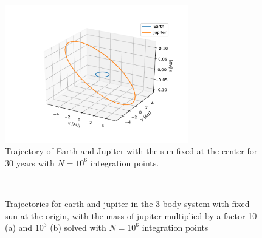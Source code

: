 \documentclass[10pt,showpacs,preprintnumbers,amsmath,amssymb,nofootinbib,aps,prl,twocolumn,groupedaddress,superscriptaddress,showkeys]{revtex4-1}
\begin{document}
  \begin{figure}[h!]
    \center
    \includegraphics[width=8cm]{figs/exe_earth_jupiter_1_30yrs.pdf}
    \caption{Trajectory of Earth and Jupiter with the sun fixed at the center for 30 years with $N=10^6$ integration points.}
    \label{fig:jupiter_1_30}
  \end{figure}

  \begin{figure}[h!]
    \center
    \\
    \caption{Trajectories for earth and jupiter in the 3-body system with fixed sun at the origin, with the mass of jupiter multiplied by a factor 10 (a) and $10^3$ (b) solved with $N=10^6$ integration points}
    \label{fig:exe jupiter mass increase}
  \end{figure}
\end{document}

